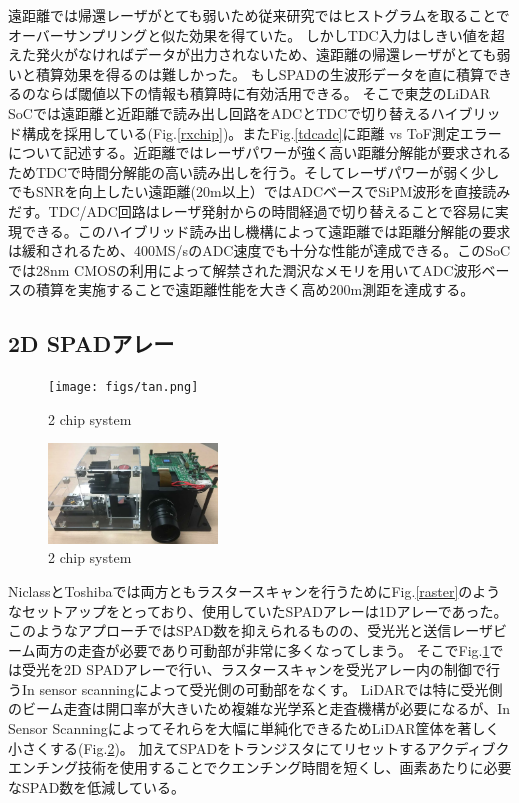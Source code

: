 \documentclass[letterpaper, 10 pt, conference]{ieeeconf}  %
\begin{document}
遠距離では帰還レーザがとても弱いため従来研究ではヒストグラムを取ることでオーバーサンプリングと似た効果を得ていた。
しかしTDC入力はしきい値を超えた発火がなければデータが出力されないため、遠距離の帰還レーザがとても弱いと積算効果を得るのは難しかった。
もしSPADの生波形データを直に積算できるのならば閾値以下の情報も積算時に有効活用できる。
そこで東芝のLiDAR SoCでは遠距離と近距離で読み出し回路をADCとTDCで切り替えるハイブリッド構成を採用している(Fig.\ref{rxchip})。またFig.\ref{tdcadc}に距離 vs ToF測定エラーについて記述する。近距離ではレーザパワーが強く高い距離分解能が要求されるためTDCで時間分解能の高い読み出しを行う。そしてレーザパワーが弱く少しでもSNRを向上したい遠距離(20m以上）ではADCベースでSiPM波形を直接読みだす。TDC/ADC回路はレーザ発射からの時間経過で切り替えることで容易に実現できる。このハイブリッド読み出し機構によって遠距離では距離分解能の要求は緩和されるため、400MS/sのADC速度でも十分な性能が達成できる。このSoCでは28nm CMOSの利用によって解禁された潤沢なメモリを用いてADC波形ベースの積算を実施することで遠距離性能を大きく高め200m測距を達成する。

\subsection{2D SPADアレー}
\begin{figure}[!t]
\centering
 \texttt{[image: figs/tan.png]}
  \caption{2 chip system \cite{ta20202d}}
\label{tan}
\end{figure}

\begin{figure}[!t]
\centering
 \includegraphics[width=0.4\textwidth]{figs/toshiba-proto.png}
  \caption{2 chip system \cite{ieee}}
\label{ieee}
\end{figure}

NiclassとToshibaでは両方ともラスタースキャンを行うためにFig.\ref{raster}のようなセットアップをとっており、使用していたSPADアレーは1Dアレーであった。
このようなアプローチではSPAD数を抑えられるものの、受光光と送信レーザビーム両方の走査が必要であり可動部が非常に多くなってしまう。
そこでFig.\ref{tan}\cite{ta20202d}では受光を2D SPADアレーで行い、ラスタースキャンを受光アレー内の制御で行うIn sensor scanningによって受光側の可動部をなくす。
LiDARでは特に受光側のビーム走査は開口率が大きいため複雑な光学系と走査機構が必要になるが、In Sensor Scanningによってそれらを大幅に単純化できるためLiDAR筐体を著しく小さくする(Fig.\ref{ieee})。
加えてSPADをトランジスタにてリセットするアクディブクエンチング技術を使用することでクエンチング時間を短くし、画素あたりに必要なSPAD数を低減している。
\end{document}

